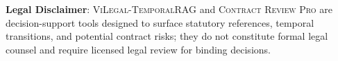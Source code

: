 \documentclass[11pt,a4paper]{article}
\begin{document}
\textbf{Legal Disclaimer}: \textsc{ViLegal-TemporalRAG} and \textsc{Contract Review Pro} are decision-support tools designed to surface statutory references, temporal transitions, and potential contract risks; they do not constitute formal legal counsel and require licensed legal review for binding decisions.



\end{document}
